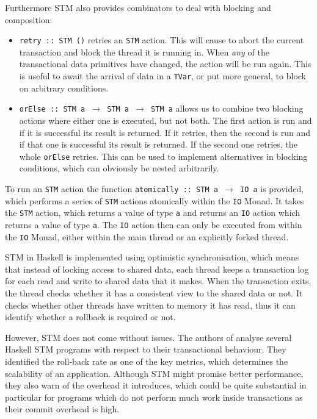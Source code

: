 Furthermore STM also provides combinators to deal with blocking and composition:

\begin{itemize}
	\item \texttt{retry :: STM ()} retries an \texttt{STM} action. This will cause to abort the current transaction and block the thread it is running in. When \textit{any} of the transactional data primitives have changed, the action will be run again. This is useful to await the arrival of data in a \texttt{TVar}, or put more general, to block on arbitrary conditions. 
	
	\item \texttt{orElse :: STM a $\rightarrow$ STM a $\rightarrow$ STM a} allows us to combine two blocking actions where either one is executed, but not both. The first action is run and if it is successful its result is returned. If it retries, then the second is run and if that one is successful its result is returned. If the second one retries, the whole \texttt{orElse} retries. This can be used to implement alternatives in blocking conditions, which can obviously be nested arbitrarily.
\end{itemize}

To run an \texttt{STM} action the function \texttt{atomically :: STM a $\rightarrow$ IO a} is provided, which performs a series of \texttt{STM} actions atomically within the \texttt{IO} Monad. It takes the \texttt{STM} action, which returns a value of type \texttt{a} and returns an \texttt{IO} action which returns a value of type \texttt{a}. The \texttt{IO} action then can only be executed from within the \texttt{IO} Monad, either within the main thread or an explicitly forked thread.

STM in Haskell is implemented using optimistic synchronisation, which means that instead of locking access to shared data, each thread keeps a transaction log for each read and write to shared data that it makes. When the transaction exits, the thread checks whether it has a consistent view to the shared data or not. It checks whether other threads have written to memory it has read, thus it can identify whether a rollback is required or not.

However, STM does not come without issues. The authors of \cite{perfumo_limits_2008} analyse several Haskell STM programs with respect to their transactional behaviour. They identified the roll-back rate as one of the key metrics, which determines the scalability of an application. Although STM might promise better performance, they also warn of the overhead it introduces, which could be quite substantial in particular for programs which do not perform much work inside transactions as their commit overhead is high.

